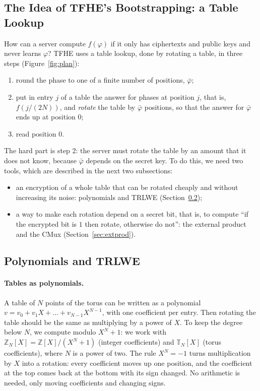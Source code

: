 \documentclass[12pt]{article}
\theoremstyle{plain}
\theoremstyle{definition}
\newcommand{\T}{\mathbb{T}}
\newcommand{\Z}{\mathbb{Z}}
\newcommand{\TN}{\T_N[X]}
\newcommand{\ZN}{\Z_N[X]}
\begin{document}
\subsection{The Idea of TFHE's Bootstrapping: a Table Lookup}
\label{sec:plan}

How can a server compute $f(\varphi)$ if it only has ciphertexts and public keys
and never learns $\varphi$? TFHE uses a table lookup, done by rotating a table,
in three steps (Figure~\ref{fig:plan}):
\begin{enumerate}
  \item round the phase to one of a finite number of positions, $\bar\varphi$;
  \item put in entry $j$ of a table the answer for phases at position $j$,
        that is, $f(j/(2N))$, and \emph{rotate} the table by $\bar\varphi$
        positions, so that the answer for $\bar\varphi$ ends up at position $0$;
  \item read position $0$.
\end{enumerate}
The hard part is step 2: the server must rotate the table by an amount that it
does not know, because $\bar\varphi$ depends on the secret key. To do this, we
need two tools, which are described in the next two subsections:
\begin{itemize}
  \item[(a)] an encryption of a whole table that can be rotated cheaply and
        without increasing its noise: polynomials and TRLWE
        (Section~\ref{sec:trlwe});
  \item[(b)] a way to make each rotation depend on a secret bit, that is, to
        compute ``if the encrypted bit is $1$ then rotate, otherwise do not'':
        the external product and the CMux (Section~\ref{sec:extprod}).
\end{itemize}



\subsection{Polynomials and TRLWE}
\label{sec:trlwe}

\paragraph{Tables as polynomials.}
A table of $N$ points of the torus can be written as a polynomial
$v=v_0+v_1X+\dots+v_{N-1}X^{N-1}$, with one coefficient per entry. Then rotating
the table should be the same as multiplying by a power of $X$. To keep the
degree below $N$, we compute modulo $X^N+1$: we work with $\ZN=\Z[X]/(X^N+1)$
(integer coefficients) and $\TN$ (torus coefficients), where $N$ is a power of
two. The rule $X^N=-1$ turns multiplication by $X$ into a rotation: every
coefficient moves up one position, and the coefficient at the top comes back
at the bottom with its sign changed. No arithmetic is needed, only moving
coefficients and changing signs.
\end{document}
